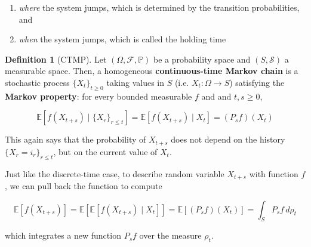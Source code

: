 \documentclass{article}
\theoremstyle{definition}
\theoremstyle{remark}
\theoremstyle{definition}
\newtheorem{definition}{Definition}[section]
\begin{document}
  \begin{enumerate}
    \item \textit{where} the system jumps, which is determined by the transition probabilities, and 
    \item \textit{when} the system jumps, which is called the holding time
  \end{enumerate}

  \begin{definition}[CTMP]
    Let $(\Omega, \mathcal{F}, \mathbb{P})$ be a probability space and $(S, \mathcal{S})$ a measurable space. Then, a homogeneous \textbf{continuous-time Markov chain} is a stochastic process $\{X_t\}_{t \geq 0}$ taking values in $S$ (i.e. $X_t: \Omega \rightarrow S$) satisfying the \textbf{Markov property}: for every bounded measurable $f$ and and $t, s \geq 0$, 

      \[\mathbb{E}[ f(X_{t + s}) \mid \{X_r\}_{r \leq t} ] = \mathbb{E}[ f(X_{t + s}) \mid X_t ] = (P_s f)(X_t)\]

    This again says that the probability of $X_{t + s}$ does not depend on the history $\{X_r = i_r\}_{r \leq t}$, but on the current value of $X_t$. 
  \end{definition}

  Just like the discrete-time case, to describe random variable $X_{t + s}$ with function $f$, we can pull back the function to compute 

    \[\mathbb{E}[f(X_{t + s})] = \mathbb{E}[ \mathbb{E}[ f(X_{t + s}) \mid X_t]] = \mathbb{E}[ (P_s f) (X_t)] = \int_S P_s f \, d\rho_t\]

  which integrates a new function $P_s f$ over the measure $\rho_t$. 
\end{document}
